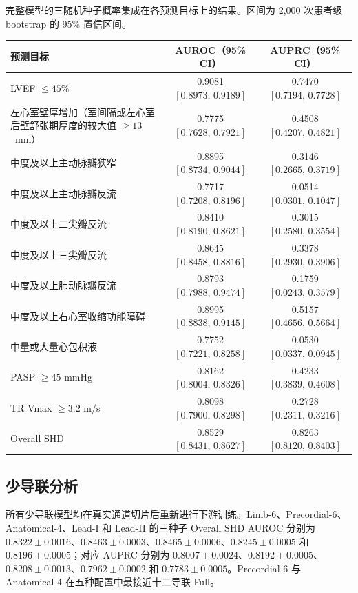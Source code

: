 \begin{bspcwidetable}[!tbp]
\centering
\BSPCtableformat

\caption{完整模型的三随机种子概率集成在各预测目标上的结果。区间为 2,000 次患者级 bootstrap 的 95\% 置信区间。}
\label{tab:endpoints}
\begin{tabularx}{\textwidth}{Ycc}
\toprule
预测目标 & AUROC（95\% CI） & AUPRC（95\% CI） \\
\midrule
LVEF $\leq45\%$ & 0.9081 $[0.8973,\,0.9189]$ & 0.7470 $[0.7194,\,0.7728]$ \\
左心室壁厚增加（室间隔或左心室后壁舒张期厚度的较大值 $\geq13$~mm） & 0.7775 $[0.7628,\,0.7921]$ & 0.4508 $[0.4207,\,0.4821]$ \\
中度及以上主动脉瓣狭窄 & 0.8895 $[0.8734,\,0.9044]$ & 0.3146 $[0.2665,\,0.3719]$ \\
中度及以上主动脉瓣反流 & 0.7717 $[0.7208,\,0.8196]$ & 0.0514 $[0.0301,\,0.1047]$ \\
中度及以上二尖瓣反流 & 0.8410 $[0.8190,\,0.8621]$ & 0.3015 $[0.2580,\,0.3554]$ \\
中度及以上三尖瓣反流 & 0.8645 $[0.8458,\,0.8816]$ & 0.3378 $[0.2930,\,0.3906]$ \\
中度及以上肺动脉瓣反流 & 0.8793 $[0.7988,\,0.9474]$ & 0.1759 $[0.0243,\,0.3579]$ \\
中度及以上右心室收缩功能障碍 & 0.8995 $[0.8838,\,0.9145]$ & 0.5157 $[0.4656,\,0.5664]$ \\
中量或大量心包积液 & 0.7752 $[0.7221,\,0.8258]$ & 0.0530 $[0.0337,\,0.0945]$ \\
PASP $\geq45$ mmHg & 0.8162 $[0.8004,\,0.8326]$ & 0.4233 $[0.3839,\,0.4608]$ \\
TR Vmax $\geq3.2$ m/s & 0.8098 $[0.7900,\,0.8298]$ & 0.2728 $[0.2311,\,0.3216]$ \\
Overall SHD & 0.8529 $[0.8431,\,0.8627]$ & 0.8263 $[0.8120,\,0.8403]$ \\
\bottomrule
\end{tabularx}

\end{bspcwidetable}

\BSPCkeependpointorder

\subsection{少导联分析}
\label{sec:results_reduced_leads}

所有少导联模型均在真实通道切片后重新进行下游训练。Limb-6、Precordial-6、Anatomical-4、Lead-I 和 Lead-II 的三种子 Overall SHD AUROC 分别为 $0.8322\pm0.0016$、$0.8463\pm0.0003$、$0.8465\pm0.0006$、$0.8245\pm0.0005$ 和 $0.8196\pm0.0005$；对应 AUPRC 分别为 $0.8007\pm0.0024$、$0.8192\pm0.0005$、$0.8208\pm0.0013$、$0.7962\pm0.0002$ 和 $0.7783\pm0.0005$。Precordial-6 与 Anatomical-4 在五种配置中最接近十二导联 Full。

